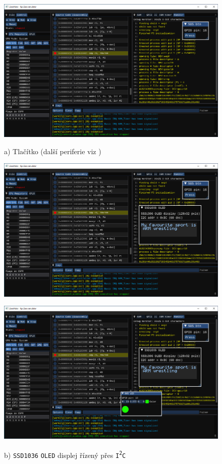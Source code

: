 \documentclass[compress]{beamer}
\begin{document}
\begin{frame}
	\centering \Large
	\begin{overlayarea}{\textwidth}{\textheight}
		\begin{figure}
			\centering
			{%
				\includegraphics[width=.85\textwidth]{img/screenshot-02.pdf}%
				\vspace{-0.4cm}
				\caption{a) Tlačítko (další periferie viz  \href{https://home.zcu.cz/~ublm/files/os/kiv-dpp-01-en.pdf}{})}
			}%
			{%
				\includegraphics[width=.85\textwidth]{img/screenshot-03.pdf}%
				\vspace{-0.4cm}
				\caption{b) \texttt{SSD1036} \texttt{OLED} displej řízený přes \texttt{I\textsuperscript{2}C}}
			}%
			{%
				\includegraphics[width=.85\textwidth]{img/screenshot-04.pdf}%
}
\end{figure}
\end{overlayarea}
\end{frame}
\end{document}
